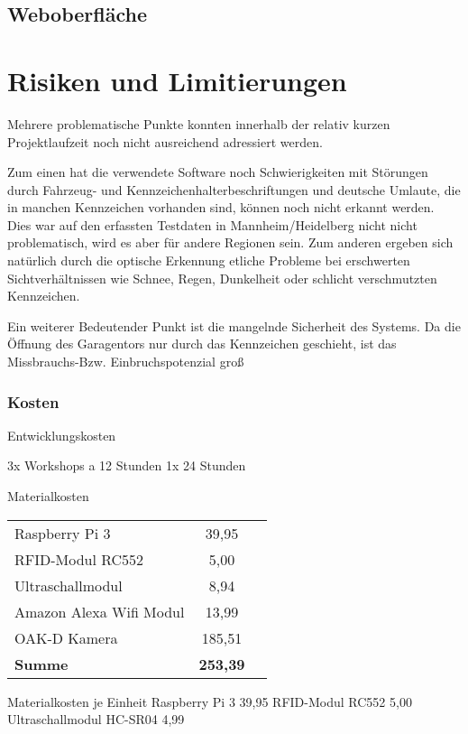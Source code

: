 \section{Weboberfläche}




\chapter{Risiken und Limitierungen}

Mehrere problematische Punkte konnten innerhalb der relativ kurzen Projektlaufzeit noch nicht ausreichend adressiert werden. 

Zum einen hat die verwendete Software noch Schwierigkeiten mit Störungen durch Fahrzeug- und Kennzeichenhalterbeschriftungen und deutsche Umlaute, die in manchen Kennzeichen vorhanden sind, können noch nicht erkannt werden. Dies war auf den erfassten Testdaten in Mannheim/Heidelberg nicht nicht problematisch, wird es aber für andere Regionen sein.
Zum anderen ergeben sich natürlich durch die optische Erkennung etliche Probleme bei erschwerten Sichtverhältnissen wie Schnee, Regen, Dunkelheit oder schlicht verschmutzten Kennzeichen. 

Ein weiterer Bedeutender Punkt ist die mangelnde Sicherheit des Systems. Da die Öffnung des Garagentors nur durch das Kennzeichen geschieht, ist das Missbrauchs-Bzw. Einbruchspotenzial groß

\subsection{Kosten}
Entwicklungskosten \newline

3x Workshops a 12 Stunden
1x 24 Stunden 


Materialkosten%

\begin{tabular}[h]{lcr}
Raspberry Pi 3	&   39,95 \autocite{Pi3b} \newline \\
RFID-Modul RC552 &		5,00\autocite{RFID} \newline\\
Ultraschallmodul	&  8,94\autocite{SR04} \newline \\
Amazon Alexa Wifi Modul & 13,99\autocite{eWe}	\\
OAK-D Kamera & 185,51 \\
\textbf{Summe}			&	\textbf{253,39}
\end{tabular} \newline



Materialkosten je Einheit
Raspberry Pi 3 			   39,95
RFID-Modul RC552			5,00
Ultraschallmodul HC-SR04	4,99





